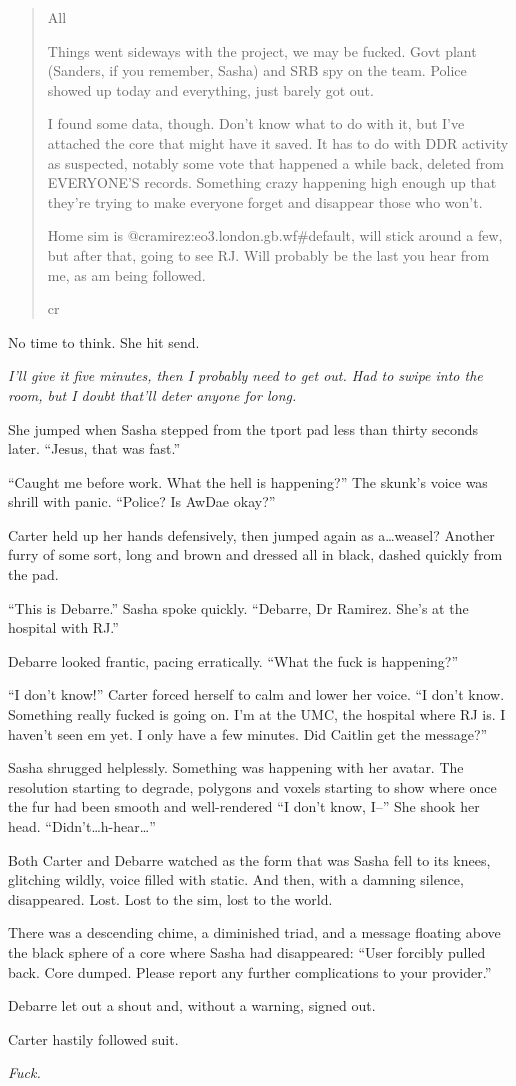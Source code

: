 \begin{quote}
All

Things went sideways with the project, we may be fucked. Govt plant (Sanders, if you remember, Sasha) and SRB spy on the team. Police showed up today and everything, just barely got out.

I found some data, though. Don't know what to do with it, but I've attached the core that might have it saved. It has to do with DDR activity as suspected, notably some vote that happened a while back, deleted from EVERYONE'S records. Something crazy happening high enough up that they're trying to make everyone forget and disappear those who won't.

Home sim is @cramirez:eo3.london.gb.wf\#default, will stick around a few, but after that, going to see RJ. Will probably be the last you hear from me, as am being followed.

cr
\end{quote}

No time to think. She hit send.

\emph{I'll give it five minutes, then I probably need to get out. Had to swipe into the room, but I doubt that'll deter anyone for long.}

She jumped when Sasha stepped from the tport pad less than thirty seconds later. ``Jesus, that was fast.''

``Caught me before work. What the hell is happening?'' The skunk's voice was shrill with panic. ``Police? Is AwDae okay?''

Carter held up her hands defensively, then jumped again as a\ldots{}weasel? Another furry of some sort, long and brown and dressed all in black, dashed quickly from the pad.

``This is Debarre.'' Sasha spoke quickly. ``Debarre, Dr Ramirez. She's at the hospital with RJ.''

Debarre looked frantic, pacing erratically. ``What the fuck is happening?''

``I don't know!'' Carter forced herself to calm and lower her voice. ``I don't know. Something really fucked is going on. I'm at the UMC, the hospital where RJ is. I haven't seen em yet. I only have a few minutes. Did Caitlin get the message?''

Sasha shrugged helplessly. Something was happening with her avatar. The resolution starting to degrade, polygons and voxels starting to show where once the fur had been smooth and well-rendered ``I don't know, I--'' She shook her head. ``Didn't\ldots{}h-hear\ldots{}''

Both Carter and Debarre watched as the form that was Sasha fell to its knees, glitching wildly, voice filled with static. And then, with a damning silence, disappeared. Lost. Lost to the sim, lost to the world.

There was a descending chime, a diminished triad, and a message floating above the black sphere of a core where Sasha had disappeared: ``User forcibly pulled back. Core dumped. Please report any further complications to your provider.''

Debarre let out a shout and, without a warning, signed out.

Carter hastily followed suit.

\emph{Fuck.}
